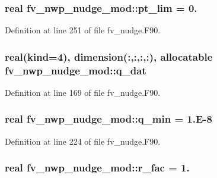 \subsubsection[{pt\-\_\-lim}]{\setlength{\rightskip}{0pt plus 5cm}real fv\-\_\-nwp\-\_\-nudge\-\_\-mod\-::pt\-\_\-lim = 0.\hspace{0.3cm}{\ttfamily [private]}}\label{classfv__nwp__nudge__mod_a865347a5d8e5faa5502349ef5af5712c}


Definition at line 251 of file fv\-\_\-nudge.\-F90.

\subsubsection[{q\-\_\-dat}]{\setlength{\rightskip}{0pt plus 5cm}real(kind=4), dimension(\-:,\-:,\-:,\-:), allocatable fv\-\_\-nwp\-\_\-nudge\-\_\-mod\-::q\-\_\-dat\hspace{0.3cm}{\ttfamily [private]}}\label{classfv__nwp__nudge__mod_a35d70de0bf27001249d55b96b2cd229c}


Definition at line 169 of file fv\-\_\-nudge.\-F90.

\subsubsection[{q\-\_\-min}]{\setlength{\rightskip}{0pt plus 5cm}real fv\-\_\-nwp\-\_\-nudge\-\_\-mod\-::q\-\_\-min = 1.E-\/8\hspace{0.3cm}{\ttfamily [private]}}\label{classfv__nwp__nudge__mod_a6132d02b32cd548905fb9ce035177937}


Definition at line 224 of file fv\-\_\-nudge.\-F90.

\subsubsection[{r\-\_\-fac}]{\setlength{\rightskip}{0pt plus 5cm}real fv\-\_\-nwp\-\_\-nudge\-\_\-mod\-::r\-\_\-fac = 1.\hspace{0.3cm}{\ttfamily [private]}}\label{classfv__nwp__nudge__mod_ae40e38918bb6ff86846b98d42bfc9c15}


